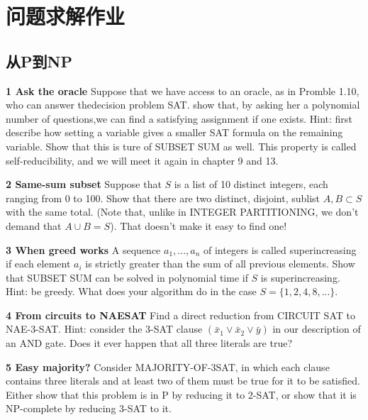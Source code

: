 \documentclass[a4paper,UTF8]{article}
\begin{document}
\section*{问题求解作业}
\subsection{从P到NP}
\textbf{1 Ask the oracle} Suppose that we have access to an oracle, as in Promble 1.10,
who can answer thedecision problem SAT. show that, by asking her a polynomial
number of questions,we can find a satisfying assignment if one exists. Hint:
first describe how setting a variable gives a smaller SAT formula on the remaining
variable. Show that this is ture of SUBSET SUM as well. This property is called
self-reducibility, and we will meet it again in chapter 9 and 13.

 \vspace{6pt}

\textbf{2 Same-sum subset} Suppose that $S$ is a list of 10 distinct integers, each
ranging from 0 to 100. Show that there are two distinct, disjoint, sublist $A,B\subset S$
with the same total. (Note that, unlike in INTEGER PARTITIONING, we don't demand that $A\cup B = S$).
That doesn't make it easy to find one!

 \vspace{6pt}

\textbf{3 When greed works} A sequence $a_{1},...,a_{n}$ of integers is called superincreasing
if each element $a_{i}$ is strictly greater than the sum of all previous elements.
Show that SUBSET SUM can be solved in polynomial time if $S$ is superincreasing.
Hint: be greedy. What does your algorithm do in the case $S=\{1,2,4,8,...\}$.

\vspace{6pt}

\textbf{4 From circuits to NAESAT} Find a direct reduction from CIRCUIT SAT to NAE-3-SAT.
Hint: consider the 3-SAT clause $(\bar{x}_{1} \vee \bar{x}_{2} \vee \bar{y})$ in our description
of an AND gate. Does it ever happen that all three literals are true?

\vspace{6pt}

\textbf{5 Easy majority?} Consider MAJORITY-OF-3SAT, in which each clause contains
three literals and at least two of them must be true for it to be satisfied. Either
show that this problem is in P by reducing it to 2-SAT, or show that it is NP-complete
by reducing 3-SAT to it.
\end{document}
